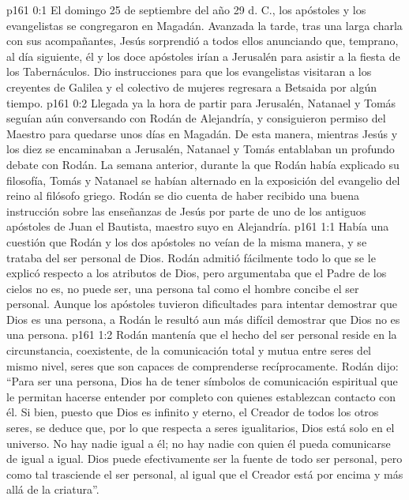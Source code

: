 \author{Comisión de seres intermedios}
\vs p161 0:1 El domingo 25 de septiembre del año 29 d. C., los apóstoles y los evangelistas se congregaron en Magadán. Avanzada la tarde, tras una larga charla con sus acompañantes, Jesús sorprendió a todos ellos anunciando que, temprano, al día siguiente, él y los doce apóstoles irían a Jerusalén para asistir a la fiesta de los Tabernáculos. Dio instrucciones para que los evangelistas visitaran a los creyentes de Galilea y el colectivo de mujeres regresara a Betsaida por algún tiempo.
\vs p161 0:2 Llegada ya la hora de partir para Jerusalén, Natanael y Tomás seguían aún conversando con Rodán de Alejandría, y consiguieron permiso del Maestro para quedarse unos días en Magadán. De esta manera, mientras Jesús y los diez se encaminaban a Jerusalén, Natanael y Tomás entablaban un profundo debate con Rodán. La semana anterior, durante la que Rodán había explicado su filosofía, Tomás y Natanael se habían alternado en la exposición del evangelio del reino al filósofo griego. Rodán se dio cuenta de haber recibido una buena instrucción sobre las enseñanzas de Jesús por parte de uno de los antiguos apóstoles de Juan el Bautista, maestro suyo en Alejandría.
\vs p161 1:1 Había una cuestión que Rodán y los dos apóstoles no veían de la misma manera, y se trataba del ser personal de Dios. Rodán admitió fácilmente todo lo que se le explicó respecto a los atributos de Dios, pero argumentaba que el Padre de los cielos no es, no puede ser, una persona tal como el hombre concibe el ser personal. Aunque los apóstoles tuvieron dificultades para intentar demostrar que Dios es una persona, a Rodán le resultó aun más difícil demostrar que Dios no es una persona.
\vs p161 1:2 Rodán mantenía que el hecho del ser personal reside en la circunstancia, coexistente, de la comunicación total y mutua entre seres del mismo nivel, seres que son capaces de comprenderse recíprocamente. Rodán dijo: “Para ser una persona, Dios ha de tener símbolos de comunicación espiritual que le permitan hacerse entender por completo con quienes establezcan contacto con él. Si bien, puesto que Dios es infinito y eterno, el Creador de todos los otros seres, se deduce que, por lo que respecta a seres igualitarios, Dios está solo en el universo. No hay nadie igual a él; no hay nadie con quien él pueda comunicarse de igual a igual. Dios puede efectivamente ser la fuente de todo ser personal, pero como tal trasciende el ser personal, al igual que el Creador está por encima y más allá de la criatura”.
